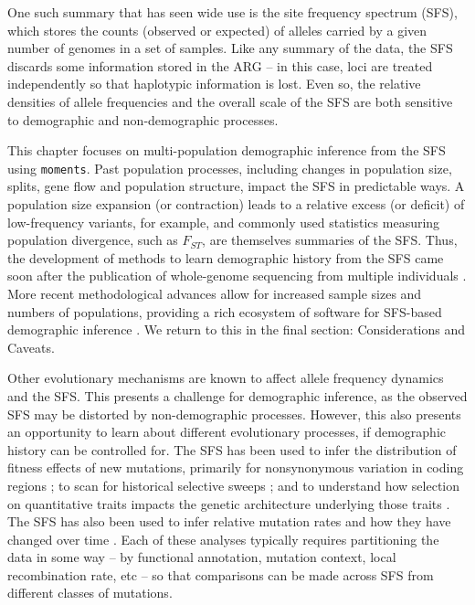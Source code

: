 \documentclass[]{article}
\newcommand{\moments}{\texttt{moments}\xspace}
\begin{document}
One such summary that has seen wide use is the site frequency spectrum (SFS),
which stores the counts (observed or expected) of alleles carried by a given
number of genomes in a set of samples. Like any summary of the data, the SFS
discards some information stored in the ARG -- in this case, loci are treated
independently so that haplotypic information is lost. Even so, the relative
densities of allele frequencies and the overall scale of the SFS are both
sensitive to demographic and non-demographic processes.

This chapter focuses on multi-population demographic inference from the SFS
using \moments \citep{jouganous2017inferring}. Past population processes,
including changes in population size, splits, gene flow and population
structure, impact the SFS in predictable ways. A population size expansion (or
contraction) leads to a relative excess (or deficit) of low-frequency variants,
for example, and commonly used statistics measuring population divergence, such
as $F_{ST}$, are themselves summaries of the SFS. Thus, the development of
methods to learn demographic history from the SFS came soon after the
publication of whole-genome sequencing from multiple individuals
\citep{marth2004allele, williamson2005simultaneous}. More recent methodological
advances allow for increased sample sizes and numbers of populations, providing
a rich ecosystem of software for SFS-based demographic inference
\citep{gutenkunst2009inferring, excoffier2011fastsimcoal,
gravel2011demographic, jouganous2017inferring, ragsdale2018genomic,
kamm2020efficiently, dilber2024faster}. We return to this in the final section:
Considerations and Caveats.

Other evolutionary mechanisms are known to affect allele frequency dynamics and
the SFS. This presents a challenge for demographic inference, as the observed
SFS may be distorted by non-demographic processes. However, this also presents
an opportunity to learn about different evolutionary processes, if demographic
history can be controlled for. The SFS has been used to infer the distribution
of fitness effects of new mutations, primarily for nonsynonymous variation in
coding regions \citep[e.g.,][]{eyre2006distribution, boyko2008assessing,
kim2017inference}; to scan for historical selective sweeps
\citep[e.g.,][]{kim2002detecting, nielsen2005genomic}; and to understand how
selection on quantitative traits impacts the genetic architecture underlying
those traits \citep[eg.,][]{patel2024conditional, ragsdale2024archaic}. The SFS
has also been used to infer relative mutation rates and how they have changed
over time \citep{dewitt2021nonparametric}. Each of these analyses typically
requires partitioning the data in some way -- by functional annotation,
mutation context, local recombination rate, etc -- so that comparisons can be
made across SFS from different classes of mutations.
\end{document}
